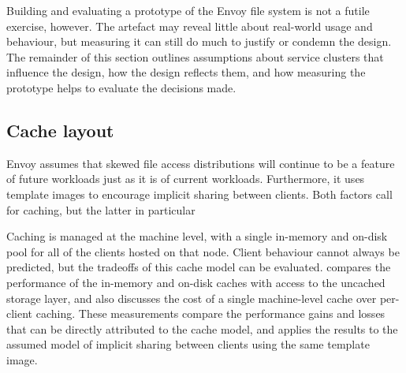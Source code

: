 Building and evaluating a prototype of the Envoy file system is not a futile exercise, however. The artefact may reveal little about real-world usage and behaviour, but measuring it can still do much to justify or condemn the design. The remainder of this section outlines assumptions about service clusters that influence the design, how the design reflects them, and how measuring the prototype helps to evaluate the decisions made.

\subsection{Cache layout}


Envoy assumes that skewed file access distributions will continue to be a feature of future workloads just as it is of current workloads. Furthermore, it uses template images to encourage implicit sharing between clients. Both factors call for caching, but the latter in particular 

Caching is managed at the machine level, with a single in-memory and on-disk pool for all of the clients hosted on that node. Client behaviour cannot always be predicted, but the tradeoffs of this cache model can be evaluated.  compares the performance of the in-memory and on-disk caches with access to the uncached storage layer, and also discusses the cost of a single machine-level cache over per-client caching. These measurements compare the performance gains and losses that can be directly attributed to the cache model, and  applies the results to the assumed model of implicit sharing between clients using the same template image.

